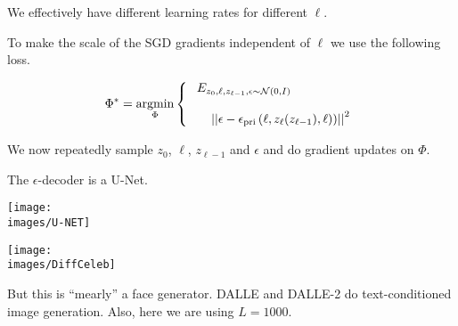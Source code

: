 {\vfill
We effectively have different learning rates for different $\ell$.


To make the scale of the SGD gradients independent of $\ell$ we use the following loss.

\vfill
$$\Phi^* = \operatorname*{argmin}_{\Phi}
\left\{\begin{array}{l}\;E_{z_0,\ell,z_{\ell-1},\epsilon \sim {\cal N}(0,I)}\; \\
\\
~\;\;\;\;\left|\left|\epsilon - \epsilon_{\mathrm{pri}}\left(\ell,z_\ell(z_{\ell-1}),\ell)\right)\right|\right|^2
\end{array}\right.$$

\vfill
We now repeatedly sample $z_0$, $\ell$, $z_{\ell-1}$ and $\epsilon$ and do gradient updates on $\Phi$.


The $\epsilon$-decoder is a U-Net.

\centerline{\texttt{[image: \\images/U-NET]}}


\centerline{\texttt{[image: \\images/DiffCeleb]}}

\vfill
But this is ``mearly'' a face generator. DALLE and DALLE-2 do text-conditioned image generation.  Also, here we are using $L = 1000$.
}


